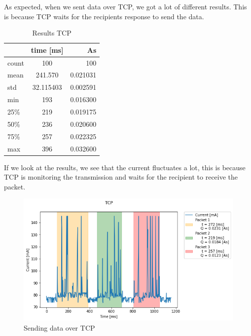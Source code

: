 As expected, when we sent data over TCP, we got a lot of different results.
This is because TCP waits for the recipients response to send the data. \cite{postel1981transmission}
\begin{table}[htbp]
    \begin{center}
        \caption{Results TCP}
        \label{tab:table1}
        \begin{tabular}{|l|c|r|}
        \hline
        & \textbf{time [ms]} & \textbf{As}\\
        \hline
        count & 100 & 100\\
        mean & 241.570 & 0.021031\\
        std & 32.115403 & 0.002591\\
        min & 193 & 0.016300\\
        25\%  & 219 & 0.019175\\
        50\% & 236 & 0.020600\\
        75\%  & 257 & 0.022325\\
        max & 396 & 0.032600\\
        \hline
        \end{tabular}
    \end{center}
\end{table}

If we look at the results, we see that the current fluctuates a lot,
this is because TCP is monitoring the transmission 
and waits for the recipient to receive the packet.

\begin{figure}[H]
    \centering
    \includegraphics[width = 1 \linewidth]{fig/udp_tcp/tcp_s_m.png}
    \caption{Sending data over TCP}
    \label{fig:tcp_s_m}
\end{figure}

